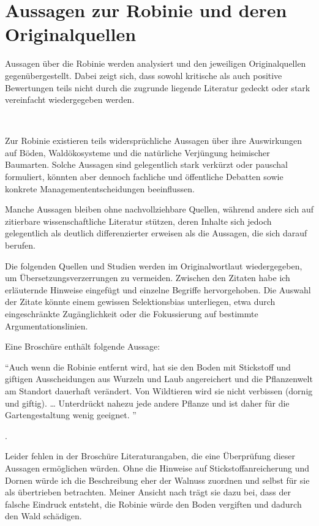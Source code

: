 \documentclass[twocolumn]{scrartcl}
\makeatletter
\newcommand{\summary}[1]{%
  \par %
  {\small\sffamily
    \noindent #1\par}
  \vspace{-0.4em}
  \noindent\makebox[\linewidth]{\rule{0.33\linewidth}{0.4pt}}\\[-1.2em]
  \@afterindentfalse\@afterheading
}
\makeatother
\begin{document}
\section{Aussagen zur Robinie und deren Originalquellen}

\summary{Aussagen über die Robinie werden analysiert und den
  jeweiligen Originalquellen gegenübergestellt. Dabei zeigt sich, dass
  sowohl kritische als auch positive Bewertungen teils nicht durch die
  zugrunde liegende Literatur gedeckt oder stark vereinfacht
  wiedergegeben werden.}

Zur Robinie existieren teils widersprüchliche Aussagen über ihre
Auswirkungen auf Böden, Waldökosysteme und die natürliche Verjüngung
heimischer Baumarten. Solche Aussagen sind gelegentlich stark verkürzt
oder pauschal formuliert, könnten aber dennoch fachliche und
öffentliche Debatten sowie konkrete Managemententscheidungen
beeinflussen.

Manche Aussagen bleiben ohne nachvollziehbare Quellen, während andere
sich auf zitierbare wissenschaftliche Literatur stützen, deren Inhalte
sich jedoch gelegentlich als deutlich differenzierter erweisen als die
Aussagen, die sich darauf berufen.

Die folgenden Quellen und Studien werden im Originalwortlaut
wiedergegeben, um Übersetzungsverzerrungen zu vermeiden. Zwischen den
Zitaten habe ich erläuternde Hinweise eingefügt und einzelne Begriffe
hervorgehoben. Die Auswahl der Zitate könnte einem gewissen
Selektionsbias unterliegen, etwa durch eingeschränkte Zugänglichkeit
oder die Fokussierung auf bestimmte Argumentationslinien.

Eine Broschüre enthält folgende Aussage:

\hypertarget{german:oebf2019aliensAusDemGarten}{\enquote{Auch wenn die Robinie entfernt wird, hat sie den Boden mit Stickstoff und giftigen Ausscheidungen aus Wurzeln und Laub angereichert und die Pflanzenwelt am Standort dauerhaft verändert. Von Wildtieren wird sie nicht verbissen (dornig und giftig). \dots
  Unterdrückt nahezu jede andere Pflanze und ist daher für die Gartengestaltung wenig geeignet.%
}} \citep{oebf2019aliensAusDemGarten}.

Leider fehlen in der Broschüre Literaturangaben, die eine Überprüfung
dieser Aussagen ermöglichen würden. Ohne die Hinweise auf
Stickstoffanreicherung und Dornen würde ich die Beschreibung eher der
Walnuss zuordnen und selbst für sie als übertrieben betrachten. Meiner
Ansicht nach trägt sie dazu bei, dass der falsche Eindruck entsteht,
die Robinie würde den Boden vergiften und dadurch den Wald schädigen.
\end{document}

